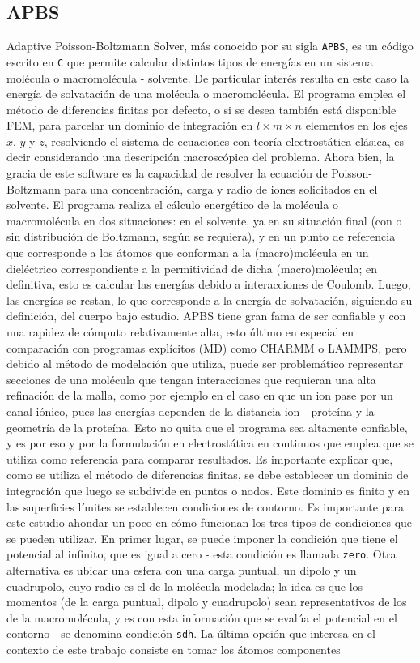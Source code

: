 \documentclass[12pt, oneside, numbers, spanish]{ezthesis}
\numberwithin{equation}{section}
\begin{document}
\subsection{APBS}\label{subsec:APBS}
Adaptive Poisson-Boltzmann Solver, más conocido por su sigla \texttt{APBS}, es un código escrito en \texttt{C} que permite calcular distintos tipos de energías en un sistema molécula o macromolécula - solvente. De particular interés resulta en este caso la energía de solvatación de una molécula o macromolécula. El programa emplea el método de diferencias finitas por defecto, o si se desea también está disponible FEM, para parcelar un dominio de integración en $l\times m\times n$ elementos en los ejes $x$, $y$ y $z$, resolviendo el sistema de ecuaciones con teoría electrostática clásica, es decir considerando una descripción macroscópica del problema. Ahora bien, la gracia de este software es la capacidad de resolver la ecuación de Poisson-Boltzmann para una concentración, carga y radio de iones solicitados en el solvente. El programa realiza el cálculo energético de la molécula o macromolécula en dos situaciones: en el solvente, ya en su situación final (con o sin distribución de Boltzmann, según se requiera), y en un punto de referencia que corresponde a los átomos que conforman a la (macro)molécula en un dieléctrico correspondiente a la permitividad de dicha (macro)molécula; en definitiva, esto es calcular las energías debido a interacciones de Coulomb. Luego, las energías se restan, lo que corresponde a la energía de solvatación, siguiendo su definición, del cuerpo bajo estudio. APBS tiene gran fama de ser confiable y con una rapidez de cómputo relativamente alta, esto último en especial en comparación con programas explícitos (MD) como CHARMM o LAMMPS, pero debido al método de modelación que utiliza, puede ser problemático representar secciones de una molécula que tengan interacciones que requieran una alta refinación de la malla, como por ejemplo en el caso en que un ion pase por un canal iónico, pues las energías dependen de la distancia ion - proteína y la geometría de la proteína. Esto no quita que el programa sea altamente confiable, y es por eso y por la formulación en electrostática en continuos que emplea que se utiliza como referencia para comparar resultados. Es importante explicar que, como se utiliza el método de diferencias finitas, se debe establecer un dominio de integración que luego se subdivide en puntos o nodos. Este dominio es finito y en las superficies límites se establecen condiciones de contorno. Es importante para este estudio ahondar un poco en cómo funcionan los tres tipos de condiciones que se pueden utilizar. En primer lugar, se puede imponer la condición que tiene el potencial al infinito, que es igual a cero - esta condición es llamada \texttt{zero}. Otra alternativa es ubicar una esfera con una carga puntual, un dipolo y un cuadrupolo, cuyo radio es el de la molécula modelada; la idea es que los momentos (de la carga puntual, dipolo y cuadrupolo) sean representativos de los de la macromolécula, y es con esta información que se evalúa el potencial en el contorno - se denomina condición \texttt{sdh}. La última opción que interesa en el contexto de este trabajo consiste en tomar los átomos componentes 
\end{document}

